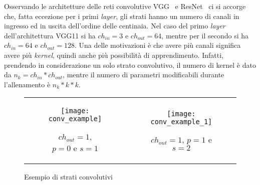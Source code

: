 Osservando le architetture delle reti convolutive VGG~\cite{vgg} e ResNet~\cite{resnet} ci si accorge che, fatta eccezione per i primi \textit{layer}, gli strati hanno un numero di canali in ingresso ed in uscita dell'ordine delle centinaia.
Nel caso del primo \textit{layer} dell'architettura VGG11 si ha $ch_{in} = 3$ e $ch_{out} = 64$, mentre per il secondo si ha $ch_{in} = 64$ e $ch_{out} = 128$.
Una delle motivazioni è che avere più canali significa avere più \textit{kernel}, quindi anche più possibilità di apprendimento.
Infatti, prendendo in considerazione un solo strato convolutivo, il numero di kernel è dato da $n_k = ch_{in}*ch_{out}$, mentre il numero di parametri modificabili durante l'allenamento è $n_k * k * k$.

\begin{figure}[ht]
  \begin{center}
  \begin{tabular}{cc}
    \begin{subfigure}{.49\linewidth}
      \centering\texttt{[image: conv\_example]}
      \caption{$ch_{out}=1$, $p=0$ e $s=1$}
      \label{fig:conv_layer_1ch}
    \end{subfigure} &

    \begin{subfigure}{.49\linewidth}
      \centering\texttt{[image: conv\_example\_1]}
      \caption{$ch_{out}=1$, $p=1$ e $s=2$}
      \label{fig:conv_layer_1ch_p1_s2}
    \end{subfigure}


  \end{tabular}
  \caption{Esempio di strati convolutivi}
  \label{fig:conv_layer}
  \end{center}
\end{figure}


